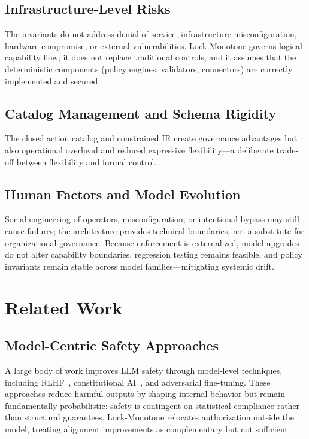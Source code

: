 \documentclass[conference]{IEEEtran}
\begin{document}
\subsection{Infrastructure-Level Risks}
The invariants do not address denial-of-service, infrastructure
misconfiguration, hardware compromise, or external vulnerabilities.
Lock-Monotone governs logical capability flow; it does not replace
traditional controls, and it assumes that the deterministic components
(policy engines, validators, connectors) are correctly implemented and
secured.

\subsection{Catalog Management and Schema Rigidity}
The closed action catalog and constrained IR create governance advantages
but also operational overhead and reduced expressive flexibility---a
deliberate trade-off between flexibility and formal control.

\subsection{Human Factors and Model Evolution}
Social engineering of operators, misconfiguration, or intentional bypass
may still cause failures; the architecture provides technical boundaries,
not a substitute for organizational governance. Because enforcement is
externalized, model upgrades do not alter capability boundaries, regression
testing remains feasible, and policy invariants remain stable across model
families---mitigating systemic drift.

\section{Related Work}
\label{sec:related}

\subsection{Model-Centric Safety Approaches}
A large body of work improves LLM safety through model-level techniques,
including RLHF~\cite{ouyang2022instructgpt}, constitutional
AI~\cite{bai2022constitutional}, and adversarial fine-tuning. These
approaches reduce harmful outputs by shaping internal behavior but remain
fundamentally probabilistic: safety is contingent on statistical
compliance rather than structural guarantees. Lock-Monotone relocates
authorization outside the model, treating alignment improvements as
complementary but not sufficient.
\end{document}
